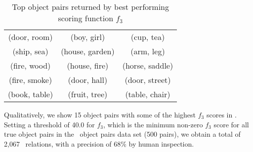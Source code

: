 
\begin{table}[th]
\small
	\centering
	\begin{tabular}{|ccc|}
		\hline
		(door, room)  & (boy, girl)     & (cup, tea)      \\
		(ship, sea)   & (house, garden) & (arm, leg)      \\
		(fire, wood)  & (house, fire)   & (horse, saddle) \\
		(fire, smoke) & (door, hall)    & (door, street)  \\
		(book, table) & (fruit, tree)   & (table, chair)  \\ \hline
	\end{tabular}
	\caption{Top object pairs returned by best performing scoring function $f_3$}
	\label{tbl:toppairs}
\end{table}
Qualitatively, we show 15 object pairs with some of the highest $f_3$ scores
in .
Setting a threshold of 40.0 for $f_3$, which is the minimum non-zero
$f_3$ score for all true object pairs in the \lnear\ object pairs 
data set (500 pairs), we obtain a total of 2,067 \lnear\ relations, with
a precision of 68\% by human inspection.

